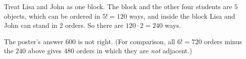 Treat Lisa and John as one block. The block and the other four students are $5$ objects, which can be ordered in $5!=120$ ways, and inside the block Lisa and John can stand in $2$ orders. So there are $120\cdot2=\boxed{240}$ ways.

The poster's answer $600$ is not right. (For comparison, all $6!=720$ orders minus the $240$ above gives $480$ orders in which they are \emph{not} adjacent.)
